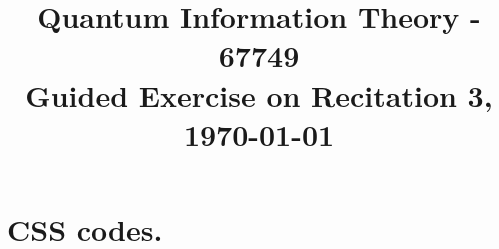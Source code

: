 \documentclass[12pt,a4paper]{article}
\title{ \begin{framed} Quantum Information Theory - 67749 \\ 
Guided Exercise on Recitation 3, \today \end{framed}  }
\date{\vspace{-5ex}}
\begin{document}
 
\maketitle{ }    


\newcommand{\CCZ}{\textbf{CCZ}}
\newcommand{\CCX}{\textbf{CCX}}


\setcounter{enumcirc}{1} 


\newcommand{\advanceday}[1][21]{%
\begingroup
\AdvanceDate[#1]%
\today%
\endgroup
}%


\newcommand{\subqCircEx}[2]{\begin{subfigure}[t]{0.5\textwidth}
        \stepcounter{enumcirc} \caption*{ (\alph{enumcirc}) #1} \centering 
        #2
    \end{subfigure}
}

\newcommand{\qCircEx}[4]{\begin{figure*}[h!]
    \centering
    \subqCircEx{#1}{#2}
    ~ 
    \subqCircEx{#3}{#4}
\end{figure*}
}

\newcommand{\qCircExfullline}[2]{\begin{figure*}[h!]
    \stepcounter{enumcirc} \caption*{ (\alph{enumcirc}) #1}
        \centering 
        #2
\end{figure*}
}

\newcommand{\Tr}{\mathbf{Tr}}

\section{CSS codes.}
\end{document}
